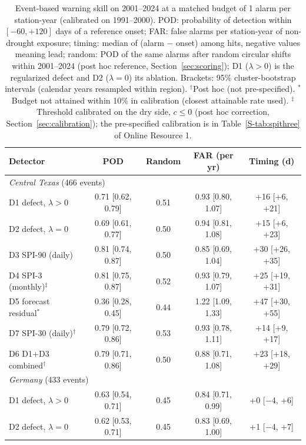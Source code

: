 \begin{table}[tbp]
\caption{Event-based warning skill on 2001--2024 at a matched budget of 1 alarm per
station-year (calibrated on 1991--2000). POD: probability of detection within $[-60,+120]$ days of a
reference onset; FAR: false alarms per station-year of non-drought exposure; timing: median of
(alarm $-$ onset) among hits, negative values meaning lead; random: POD of the same alarms after random
circular shifts within 2001--2024 (post hoc reference, Section~\ref{sec:scoring}); D1 ($\lambda>0$) is the
regularized defect and D2 ($\lambda=0$) its ablation. Brackets: 95\%
cluster-bootstrap intervals (calendar years resampled within region). $^{\dagger}$Post hoc (not
pre-specified). $^{\ast}$Budget not attained within 10\% in calibration (closest attainable rate used).
$^{\ddagger}$Threshold calibrated on the dry side, $c\le0$ (post hoc correction,
Section~\ref{sec:calibration}); the pre-specified calibration is in
Table~\ref{S-tab:spithree} of Online Resource 1.}
\label{tab:warning}
\footnotesize\setlength{\tabcolsep}{2pt}
\begin{tabular*}{\textwidth}{@{\extracolsep\fill}lcccc}
\toprule
Detector & POD & Random & FAR (per yr) & Timing (d)\\
\midrule
\multicolumn{5}{l}{\textit{Central Texas} (466 events)}\\
\quad D1 defect, $\lambda>0$ & 0.71 [0.62, 0.79] & 0.51 & 0.93 [0.80, 1.07] & +16 [+6, +21] \\
\quad D2 defect, $\lambda=0$ & 0.69 [0.61, 0.77] & 0.50 & 0.94 [0.81, 1.08] & +15 [+6, +23] \\
\quad D3 SPI-90 (daily) & 0.81 [0.74, 0.87] & 0.50 & 0.85 [0.69, 1.04] & +30 [+26, +35] \\
\quad D4 SPI-3 (monthly)$^{\ddagger}$ & 0.81 [0.75, 0.87] & 0.52 & 0.93 [0.79, 1.07] & +25 [+19, +31] \\
\quad D5 forecast residual$^{\ast}$ & 0.36 [0.28, 0.45] & 0.44 & 1.22 [1.09, 1.33] & +47 [+30, +55] \\
\quad D7 SPI-30 (daily)$^{\dagger}$ & 0.79 [0.72, 0.86] & 0.53 & 0.93 [0.78, 1.11] & +14 [+9, +17] \\
\quad D6 D1+D3 combined$^{\dagger}$ & 0.79 [0.71, 0.86] & 0.50 & 0.88 [0.71, 1.08] & +23 [+18, +29] \\
\midrule
\multicolumn{5}{l}{\textit{Germany} (433 events)}\\
\quad D1 defect, $\lambda>0$ & 0.63 [0.54, 0.71] & 0.45 & 0.84 [0.71, 0.99] & +0 [$-$4, +6] \\
\quad D2 defect, $\lambda=0$ & 0.62 [0.53, 0.71] & 0.45 & 0.83 [0.69, 1.00] & +1 [$-$4, +7] \\

\end{tabular*}
\end{table}
